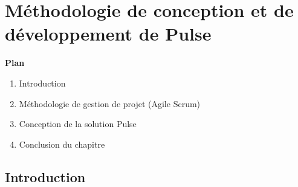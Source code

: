 ﻿\chapter{Méthodologie de conception et de développement de Pulse}  
\label{chap:methodologie}
\thispagestyle{noheaderpagenum}

\vspace{1cm}

{
    \setlength{\parindent}{0pt}
    \Large\textbf{Plan}
    \vspace{0.5cm}
    
    \renewcommand{\labelenumi}{\textbf{\arabic{enumi}.}}
    
    \begin{enumerate}[leftmargin=1.5cm, labelsep=0.5cm, itemsep=0.3cm]
        \item Introduction \dotfill \pageref{sec:c2_intro}
        
        \item Méthodologie de gestion de projet (Agile Scrum)
        \dotfill \pageref{sec:c2_agile}
        
        \item Conception de la solution Pulse
        \dotfill \pageref{sec:c2_dev}
        
        \item Conclusion du chapitre \dotfill \pageref{sec:c2_concl}
    \end{enumerate}
}
\clearpage
\thispagestyle{fancy}


\section{Introduction} \label{sec:c2_intro}
\lipsum[1][1-2]
